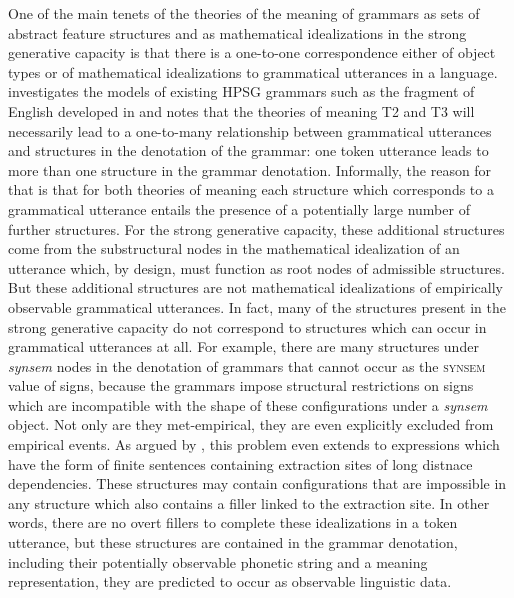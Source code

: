 \documentclass[output=paper
                ,modfonts
                ,nonflat
	        ,collection
	        ,collectionchapter
	        ,collectiontoclongg
 	        ,biblatex
                ,babelshorthands
                ,newtxmath
                ,draftmode
                ,colorlinks, citecolor=brown
]{./langsci/langscibook}
\begin{document}
{{One of the main tenets of the theories of the meaning of grammars as
sets of abstract feature structures and as mathematical idealizations
in the strong generative capacity is that there is a one-to-one
correspondence either of object types or of mathematical idealizations
to grammatical utterances in a language. \citet{Richter2007a}
investigates the models of existing HPSG grammars such as the fragment
of English developed in \cite{PollardSag1994} and notes that the
theories of meaning T2 and T3 will necessarily lead to a one-to-many
relationship between grammatical utterances and structures in the
denotation of the grammar: one token utterance leads to more than one
structure in the grammar denotation. Informally, the reason for that
is that for both theories of meaning each structure which corresponds
to a grammatical utterance entails the presence of a potentially large
number of further structures. For the strong generative capacity,
these additional structures come from the substructural nodes in the
mathematical idealization of an utterance which, by design, must
function as root nodes of admissible structures. But these additional
structures are not mathematical idealizations of empirically
observable grammatical utterances. In fact, many of the structures
present in the strong generative capacity do not correspond to
structures which can occur in grammatical utterances at all. For
example, there are many structures under \textit{synsem} nodes in the
denotation of grammars that cannot occur as the \textsc{synsem} value
of signs, because the grammars impose structural restrictions on signs
which are incompatible with the shape of these configurations under a
\textit{synsem} object. Not only are they met-empirical, they are even
explicitly excluded from empirical events. As argued by
\citet{Richter2007a}, this problem even extends to expressions which
have the form of finite sentences containing extraction sites of long
distnace dependencies. These structures may contain configurations
that are impossible in any structure which also contains a filler
linked to the extraction site. In other words, there are no overt
fillers to complete these idealizations in a token utterance, but
these structures are contained
in the grammar denotation, including their potentially observable
phonetic string and a meaning representation, they are predicted to occur
as observable linguistic data.

}}
\end{document}

